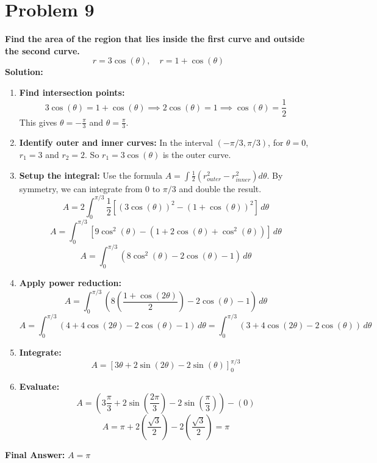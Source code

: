 \documentclass{article}
\begin{document}
\section*{Problem 9}
\textbf{Find the area of the region that lies inside the first curve and outside the second curve.}
\[ r = 3\cos(\theta), \quad r = 1 + \cos(\theta) \]
\textbf{Solution:}
\begin{enumerate}
    \item \textbf{Find intersection points:}
    \[ 3\cos(\theta) = 1 + \cos(\theta) \implies 2\cos(\theta) = 1 \implies \cos(\theta) = \frac{1}{2} \]
    This gives $\theta = -\frac{\pi}{3}$ and $\theta = \frac{\pi}{3}$.
    \item \textbf{Identify outer and inner curves:} In the interval $(-\pi/3, \pi/3)$, for $\theta=0$, $r_1=3$ and $r_2=2$. So $r_1=3\cos(\theta)$ is the outer curve.
    \item \textbf{Setup the integral:} Use the formula $A = \int \frac{1}{2}(r_{outer}^2 - r_{inner}^2)d\theta$. By symmetry, we can integrate from $0$ to $\pi/3$ and double the result.
    \[ A = 2 \int_{0}^{\pi/3} \frac{1}{2} \left[ (3\cos(\theta))^2 - (1+\cos(\theta))^2 \right] \,d\theta \]
    \[ A = \int_{0}^{\pi/3} \left[ 9\cos^2(\theta) - (1 + 2\cos(\theta) + \cos^2(\theta)) \right] \,d\theta \]
    \[ A = \int_{0}^{\pi/3} (8\cos^2(\theta) - 2\cos(\theta) - 1) \,d\theta \]
    \item \textbf{Apply power reduction:}
    \[ A = \int_{0}^{\pi/3} \left(8\left(\frac{1+\cos(2\theta)}{2}\right) - 2\cos(\theta) - 1\right) \,d\theta \]
    \[ A = \int_{0}^{\pi/3} (4 + 4\cos(2\theta) - 2\cos(\theta) - 1) \,d\theta = \int_{0}^{\pi/3} (3 + 4\cos(2\theta) - 2\cos(\theta)) \,d\theta \]
    \item \textbf{Integrate:}
    \[ A = \left[ 3\theta + 2\sin(2\theta) - 2\sin(\theta) \right]_{0}^{\pi/3} \]
    \item \textbf{Evaluate:}
    \[ A = \left( 3\frac{\pi}{3} + 2\sin(\frac{2\pi}{3}) - 2\sin(\frac{\pi}{3}) \right) - (0) \]
    \[ A = \pi + 2\left(\frac{\sqrt{3}}{2}\right) - 2\left(\frac{\sqrt{3}}{2}\right) = \pi \]
\end{enumerate}
\textbf{Final Answer:} $A = \pi$
\end{document}

